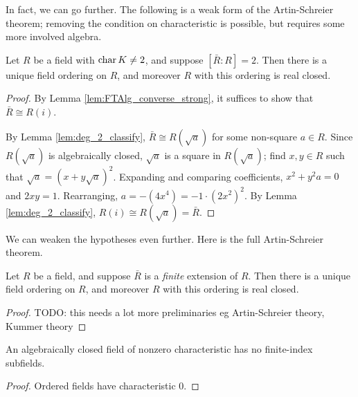 In fact, we can go further. The following is a weak form of the Artin-Schreier theorem; removing the condition on characteristic is possible, but requires some more involved algebra.

\begin{theorem}
  \label{thm:Artin-Schreier_weak}
  Let $R$ be a field with $\operatorname{char} K\neq2$, and suppose $[\bar{R}:R]=2$. Then there is a unique field ordering on $R$, and moreover $R$ with this ordering is real closed.
\end{theorem}
\begin{proof}
  By Lemma \ref{lem:FTAlg_converse_strong}, it suffices to show that $\bar{R}\cong R(i)$.

  By Lemma \ref{lem:deg_2_classify}, $\bar{R}\cong R(\sqrt{a})$ for some non-square $a\in R$. Since $R(\sqrt{a})$ is algebraically closed, $\sqrt{a}$ is a square in $R(\sqrt{a})$; find $x,y\in R$ such that $\sqrt{a}=(x+y\sqrt{a})^2$. Expanding and comparing coefficients, $x^2+y^2a=0$ and $2xy=1$. Rearranging, $a=-(4x^4)=-1\cdot(2x^2)^2$. By Lemma \ref{lem:deg_2_classify}, $R(i)\cong R(\sqrt{a})=\bar{R}$.
\end{proof}

We can weaken the hypotheses even further. Here is the full Artin-Schreier theorem.

\begin{theorem}
  \label{thm:Artin-Schreier}
  Let $R$ be a field, and suppose $\bar{R}$ is a \textit{finite} extension of $R$. Then there is a unique field ordering on $R$, and moreover $R$ with this ordering is real closed.
\end{theorem}
\begin{proof}
  TODO: this needs a lot more preliminaries eg Artin-Schreier theory, Kummer theory
\end{proof}

\begin{corollary}
  \label{cor:ACF_char_p_no_fin_ind}
  An algebraically closed field of nonzero characteristic has no finite-index subfields.
\end{corollary}
\begin{proof}
  Ordered fields have characteristic 0.
\end{proof}

